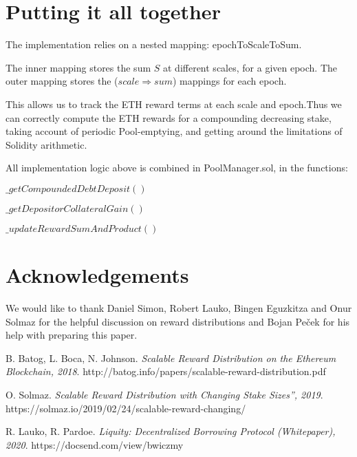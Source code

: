 \documentclass[reqno]{article}
\begin{document}
\bigskip
\section{Putting it all together}

\bigskip
The implementation relies on a nested mapping: epochToScaleToSum. 

\bigskip
The inner mapping stores the sum $S$ at different scales, for a given epoch. The outer mapping stores the ($scale \Rightarrow sum$) mappings for each epoch.

\bigskip
This allows us to track the ETH reward terms at each scale and epoch.Thus we can correctly compute the ETH rewards for a compounding decreasing stake, taking account of periodic Pool-emptying, and getting around the limitations of Solidity arithmetic.

\bigskip
All implementation logic above is combined in PoolManager.sol, in the functions:

\bigskip
$\_getCompoundedDebtDeposit()$

$\_getDepositorCollateralGain()$

$\_updateRewardSumAndProduct()$

\section{Acknowledgements}
We would like to thank Daniel Simon, Robert Lauko, Bingen Eguzkitza and Onur Solmaz for the helpful discussion on reward distributions and Bojan Peček for his help with preparing this paper.

\begin{thebibliography}{9}
B. Batog, L. Boca, N. Johnson.
\textit{Scalable Reward Distribution on the Ethereum Blockchain, 2018}. 
http://batog.info/papers/scalable-reward-distribution.pdf

O. Solmaz. 
\textit{Scalable Reward Distribution with Changing Stake Sizes”, 2019}. 
https://solmaz.io/2019/02/24/scalable-reward-changing/

R. Lauko, R. Pardoe. 
\textit{Liquity: Decentralized Borrowing Protocol (Whitepaper), 2020}. 
https://docsend.com/view/bwiczmy


\end{thebibliography}
\end{document}

